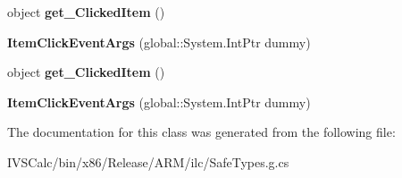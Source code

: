 \begin{DoxyCompactItemize}
object {\bfseries get\+\_\+\+Clicked\+Item} ()
\item 
\mbox{\label{class_windows_1_1_u_i_1_1_xaml_1_1_controls_1_1_item_click_event_args_a54ad389a03674aee42696b3fb3cbe14a}} 
{\bfseries Item\+Click\+Event\+Args} (global\+::\+System.\+Int\+Ptr dummy)
\item 
\mbox{\label{class_windows_1_1_u_i_1_1_xaml_1_1_controls_1_1_item_click_event_args_abe5ae6328715bda99e513c9672b5f698}} 
object {\bfseries get\+\_\+\+Clicked\+Item} ()
\item 
\mbox{\label{class_windows_1_1_u_i_1_1_xaml_1_1_controls_1_1_item_click_event_args_a54ad389a03674aee42696b3fb3cbe14a}} 
{\bfseries Item\+Click\+Event\+Args} (global\+::\+System.\+Int\+Ptr dummy)
\end{DoxyCompactItemize}


The documentation for this class was generated from the following file\+:\begin{DoxyCompactItemize}
\item 
I\+V\+S\+Calc/bin/x86/\+Release/\+A\+R\+M/ilc/Safe\+Types.\+g.\+cs\end{DoxyCompactItemize}
